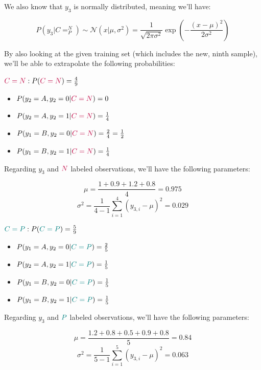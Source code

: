 \documentclass[12pt]{article}
\begin{document}
\begin{enumerate}[leftmargin=\labelsep]
  We also know that $y_3$ is normally distributed, meaning we'll have:

  $$
  P(y_3 | C = ^N_P) \sim \mathcal{N}(x | \mu, \sigma^2) = \frac{1}{\sqrt{2 \pi \sigma^2}} \exp \left( - \frac{(x - \mu)^2}{2 \sigma^2} \right)
  $$

  By also looking at the given training set (which includes the new, ninth sample), we'll be able
  to extrapolate the following probabilities:

  \pagebreak

  \begin{multicols}{2}
    \setlength{\columnseprule}{1pt}
    \def\columnseprulecolor{\color{black}}
    \centering
    $\textcolor{purple}{C = N}: P(\textcolor{purple}{C = N}) = \frac{4}{9}$
    \begin{itemize}
      \item $P(y_2 = A, y_2 = 0 | \textcolor{purple}{C = N}) = 0$
      \item $P(y_2 = A, y_2 = 1 | \textcolor{purple}{C = N}) = \frac{1}{4}$
      \item $P(y_1 = B, y_2 = 0 | \textcolor{purple}{C = N}) = \frac{2}{4} = \frac{1}{2}$
      \item $P(y_1 = B, y_2 = 1 | \textcolor{purple}{C = N}) = \frac{1}{4}$
    \end{itemize}
    Regarding $y_3$ and $\textcolor{purple}{N}$ labeled observations, we'll have the following parameters:
    
    $$
    \mu = \frac{1 + 0.9 + 1.2 + 0.8}{4} = 0.975
    $$
    $$
    \sigma^2 = \frac{1}{4 - 1} \sum_{i = 1}^4 (y_{3, i} - \mu)^2 = 0.029
    $$

    \columnbreak
    $\textcolor{teal}{C = P}: P(\textcolor{teal}{C = P}) = \frac{5}{9}$
    \begin{itemize}
      \item $P(y_1 = A, y_2 = 0 | \textcolor{teal}{C = P}) = \frac{2}{5}$
      \item $P(y_2 = A, y_2 = 1 | \textcolor{teal}{C = P}) = \frac{1}{5}$
      \item $P(y_1 = B, y_2 = 0 | \textcolor{teal}{C = P}) = \frac{1}{5}$
      \item $P(y_1 = B, y_2 = 1 | \textcolor{teal}{C = P}) = \frac{1}{5}$
    \end{itemize}
    Regarding $y_3$ and $\textcolor{teal}{P}$ labeled observations, we'll have the following parameters:

    $$
    \mu = \frac{1.2 + 0.8 + 0.5 + 0.9 + 0.8}{5} = 0.84
    $$
    $$
    \sigma^2 = \frac{1}{5 - 1} \sum_{i = 1}^5 (y_{3, i} - \mu)^2 = 0.063
    $$


\end{multicols}
\end{enumerate}
\end{document}
